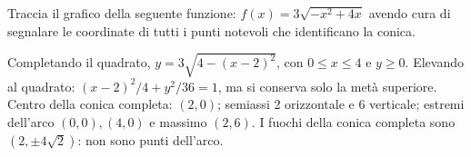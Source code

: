 
\begin{esercizio}
Traccia il grafico della seguente funzione:
    $f(x)=3\sqrt{-x^2+4x}$
    avendo cura di segnalare le coordinate di tutti i punti notevoli che identificano la conica.
\end{esercizio}

\begin{soluzione}
Completando il quadrato, $y=3\sqrt{4-(x-2)^2}$, con $0\le x\le4$ e $y\ge0$.
Elevando al quadrato: $(x-2)^2/4+y^2/36=1$, ma si conserva solo la metà superiore.
Centro della conica completa: $(2,0)$; semiassi 2 orizzontale e 6 verticale;
estremi dell'arco $(0,0),(4,0)$ e massimo $(2,6)$.
I fuochi della conica completa sono $(2,\pm4\sqrt2)$: non sono punti dell'arco.
\end{soluzione}
